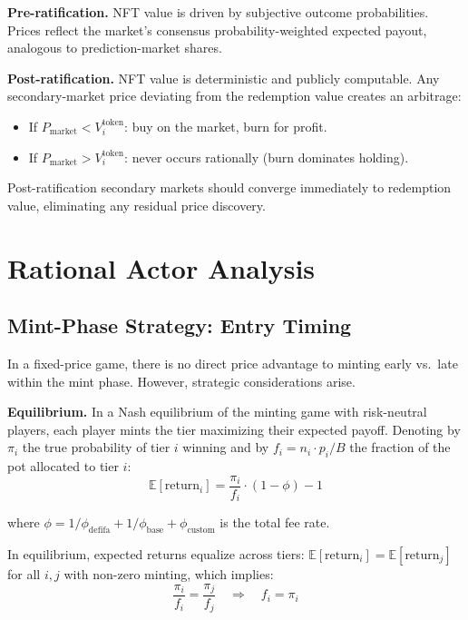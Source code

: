 \documentclass[11pt,a4paper]{article}
\begin{document}
\textbf{Pre-ratification.} NFT value is driven by subjective outcome probabilities. Prices reflect the market's consensus probability-weighted expected payout, analogous to prediction-market shares.

\textbf{Post-ratification.} NFT value is deterministic and publicly computable. Any secondary-market price deviating from the redemption value creates an arbitrage:
\begin{itemize}[nosep]
    \item If $P_{\text{market}} < V_i^{\text{token}}$: buy on the market, burn for profit.
    \item If $P_{\text{market}} > V_i^{\text{token}}$: never occurs rationally (burn dominates holding).
\end{itemize}

Post-ratification secondary markets should converge immediately to redemption value, eliminating any residual price discovery.

\section{Rational Actor Analysis}

\subsection{Mint-Phase Strategy: Entry Timing}

In a fixed-price game, there is no direct price advantage to minting early vs.\ late within the mint phase. However, strategic considerations arise.

\textbf{Equilibrium.} In a Nash equilibrium of the minting game with risk-neutral players, each player mints the tier maximizing their expected payoff. Denoting by $\pi_i$ the true probability of tier $i$ winning and by $f_i = n_i \cdot p_i / B$ the fraction of the pot allocated to tier $i$:
\begin{equation}
\mathbb{E}[\text{return}_i] = \frac{\pi_i}{f_i} \cdot (1 - \phi) - 1
\end{equation}

where $\phi = 1/\phi_{\text{defifa}} + 1/\phi_{\text{base}} + \phi_{\text{custom}}$ is the total fee rate.

In equilibrium, expected returns equalize across tiers: $\mathbb{E}[\text{return}_i] = \mathbb{E}[\text{return}_j]$ for all $i,j$ with non-zero minting, which implies:
\begin{equation}
\frac{\pi_i}{f_i} = \frac{\pi_j}{f_j} \quad \Rightarrow \quad f_i = \pi_i
\end{equation}
\end{document}
